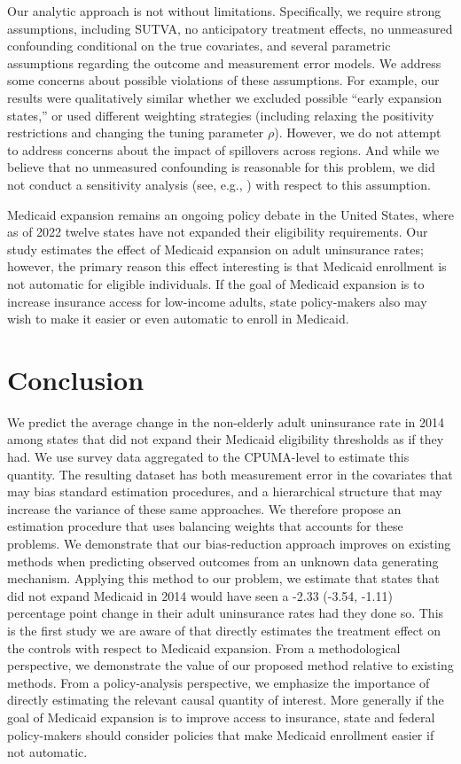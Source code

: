 \documentclass[aoas]{imsart}
\theoremstyle{plain}
\theoremstyle{remark}
\begin{document}
Our analytic approach is not without limitations. Specifically, we require strong assumptions, including SUTVA, no anticipatory treatment effects, no unmeasured confounding conditional on the true covariates, and several parametric assumptions regarding the outcome and measurement error models. We address some concerns about possible violations of these assumptions. For example, our results were qualitatively similar whether we excluded possible ``early expansion states,'' or used different weighting strategies (including relaxing the positivity restrictions and changing the tuning parameter $\rho$). However, we do not attempt to address concerns about the impact of spillovers across regions. And while we believe that no unmeasured confounding is reasonable for this problem, we did not conduct a sensitivity analysis (see, e.g., \citet{bonvini2021sensitivity}) with respect to this assumption. 

Medicaid expansion remains an ongoing policy debate in the United States, where as of 2022 twelve states have not expanded their eligibility requirements. Our study estimates the effect of Medicaid expansion on adult uninsurance rates; however, the primary reason this effect interesting is that Medicaid enrollment is not automatic for eligible individuals. If the goal of Medicaid expansion is to increase insurance access for low-income adults, state policy-makers also may wish to make it easier or even automatic to enroll in Medicaid. 

\section{Conclusion}

We predict the average change in the non-elderly adult uninsurance rate in 2014 among states that did not expand their Medicaid eligibility thresholds as if they had. We use survey data aggregated to the CPUMA-level to estimate this quantity. The resulting dataset has both measurement error in the covariates that may bias standard estimation procedures, and a hierarchical structure that may increase the variance of these same approaches. We therefore propose an estimation procedure that uses balancing weights that accounts for these problems. We demonstrate that our bias-reduction approach improves on existing methods when predicting observed outcomes from an unknown data generating mechanism. Applying this method to our problem, we estimate that states that did not expand Medicaid in 2014 would have seen a -2.33 (-3.54, -1.11) percentage point change in their adult uninsurance rates had they done so. This is the first study we are aware of that directly estimates the treatment effect on the controls with respect to Medicaid expansion. From a methodological perspective, we demonstrate the value of our proposed method relative to existing methods. From a policy-analysis perspective, we emphasize the importance of directly estimating the relevant causal quantity of interest. More generally if the goal of Medicaid expansion is to improve access to insurance, state and federal policy-makers should consider policies that make Medicaid enrollment easier if not automatic.
\end{document}
